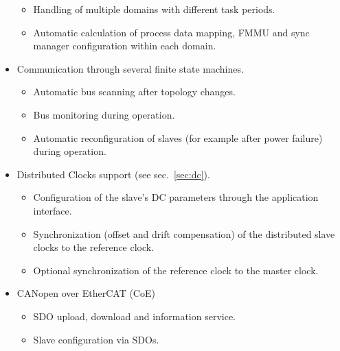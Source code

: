 \documentclass[a4paper,12pt,BCOR6mm,bibtotoc,idxtotoc]{scrbook}
\begin{document}
\begin{itemize}
  \begin{itemize}

  \item Handling of multiple domains with different task periods.

  \item Automatic calculation of process data mapping, FMMU and sync manager
  configuration within each domain.

  \end{itemize}

\item Communication through several finite state machines.

  \begin{itemize}

  \item Automatic bus scanning after topology changes.

  \item Bus monitoring during operation.

  \item Automatic reconfiguration of slaves (for example after power failure)
  during operation.

  \end{itemize}

\item Distributed Clocks support (see sec.~\ref{sec:dc}).

  \begin{itemize}

  \item Configuration of the slave's DC parameters through the application
  interface.

  \item Synchronization (offset and drift compensation) of the distributed
  slave clocks to the reference clock.

  \item Optional synchronization of the reference clock to the master clock.

  \end{itemize}

\item CANopen over EtherCAT (CoE)

  \begin{itemize}

  \item SDO upload, download and information service.

  \item Slave configuration via SDOs.


\end{itemize}
\end{itemize}
\end{document}
